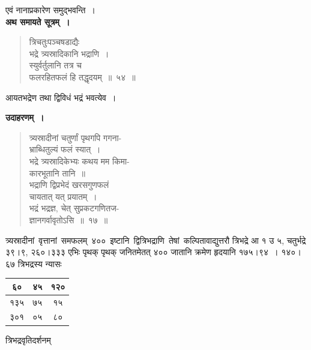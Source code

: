 \documentclass[11pt, openany]{book}
\begin{document}
एवं नानाप्रकारेण समुद्भवन्ति~।\\

\textbf{अथ समायते सूत्रम्~।}

\begin{quote}
{\gk त्रिचतुःपञ्चषडाद्यैः\\
भद्रे त्र्यस्रादिकानि भद्राणि~।\\
स्युर्वर्तुलानि तत्र च\\
फलरहितफलं हि तद्धृदयम्~॥~५४~॥}
\end{quote}

आयतभद्रेण तथा द्विविधं भद्रं भवत्येव~।

\newpage

\textbf{उदाहरणम्~।}

\begin{quote}
{\ex त्र्यस्रादीनां चतुर्णां पृथगपि गगना-\\
भ्राब्धितुल्यं फलं स्यात्~।\\
भद्रे त्र्यस्रादिकेभ्यः कथय मम किमा-\\
कारभूतानि तानि~॥\\
भद्राणि द्विप्रभेदं खरसगुणफलं\\
चायतात् यत् प्रयातम्~।\\
भद्रं भद्रज्ञ, चेत् सुप्रकटगणितज-\\
ज्ञानगर्वावृतोऽसि~॥~१७~॥}
\end{quote}

त्र्यस्रादीनां \,वृत्तानां \,समफलम् \,४०० \,इष्टानि \,द्वित्रिभद्राणि \,तेषां \,कल्पितावाद्युत्तरौ त्रिभद्रे आ १ उ ५, चतुर्भद्रे ३९।९, २६०।३३३ एभिः पृथक् पृथक् जनितमेतत् ४०० जातानि क्रमेण हृदयानि १७५।९४~। १४०।६७ त्रिभद्रस्य न्यासः

\begin{center}
\begin{tabular}{|c|c|c|}
	\hline
	६० & ४५ & १२०\\
	\hline	
	१३५ & ७५ & १५\\
	\hline
	३०१ & ०५ & ८०\\
	\hline
\end{tabular}
\end{center}

\newpage

\begin{center}
त्रिभद्रवृतिदर्शनम्	
\end{center}
\end{document}
